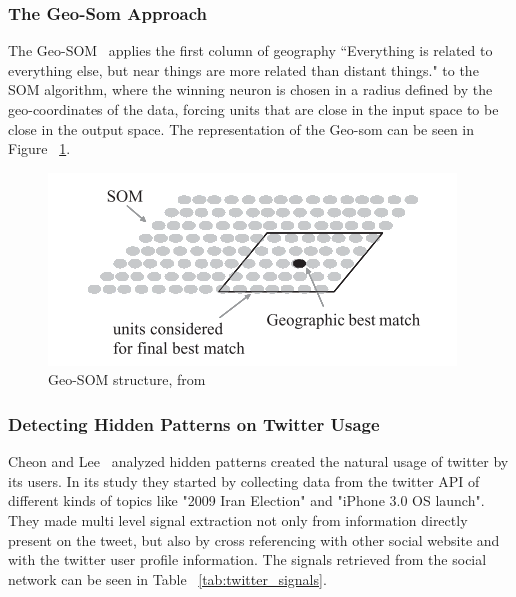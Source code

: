 \subsubsection{The Geo-Som Approach} 
\label{ssub:types_of_soms}
The Geo-SOM~\citet{Bacao2005} applies the first column of geography “Everything is related to everything else, but near things are more related than distant things." to the SOM algorithm, where the winning neuron is chosen in a radius defined by the geo-coordinates of the data, forcing units that are close in the input space to be close in the output space. The representation of the Geo-som can be seen in Figure ~\ref{fig:geo_som}.

\begin{figure}[tb]
  \begin{center}
    \includegraphics[]{images/6_geo-som.png}
  \end{center}
  \caption{Geo-SOM structure, from~\citet{Bacao2005}}
  \label{fig:geo_som}
\end{figure}

\subsubsection{Detecting Hidden Patterns on Twitter Usage} 
\label{ssub:detecting_hidden_patterns_on_twitter_usage}
Cheon and Lee~\citep{Cheong2010} analyzed hidden patterns created the natural usage of twitter by its users. In its study they started by collecting data from the twitter API of different kinds of topics like "2009 Iran Election" and "iPhone 3.0 OS launch". They made multi level signal extraction not only from information directly present on the tweet, but also by cross referencing with other social website and with the twitter user profile information. The signals retrieved from the social network can be seen in Table ~\ref{tab:twitter_signals}.

